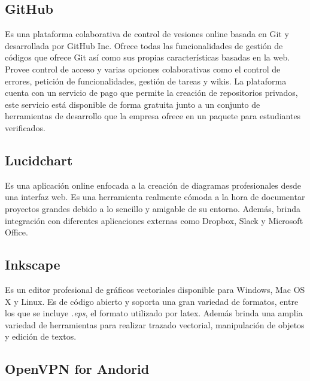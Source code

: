 \documentclass{article}
\begin{document}
    \subsection{GitHub}
        Es una plataforma colaborativa de control de vesiones online basada en Git y desarrollada por GitHub Inc. Ofrece todas las funcionalidades de gestión de códigos que ofrece Git así como sus propias características basadas en la web. Provee control de acceso y varias opciones colaborativas como el control de errores, petición de funcionalidades, gestión de tareas y wikis. La plataforma cuenta con un servicio de pago que permite la creación de repositorios privados, este servicio está disponible de forma gratuita junto a un conjunto de herramientas de desarrollo que la empresa ofrece en un paquete para estudiantes verificados.

    \subsection{Lucidchart}
        Es una aplicación online enfocada a la creación de diagramas profesionales desde una interfaz web. Es una herramienta realmente cómoda a la hora de documentar proyectos grandes debido a lo sencillo y amigable de su entorno. Además, brinda integración con diferentes aplicaciones externas como Dropbox, Slack y Microsoft Office. 

    \subsection{Inkscape}
        Es un editor profesional de gráficos vectoriales disponible para Windows, Mac OS X y Linux. Es de código abierto y soporta una gran variedad de formatos, entre los que se incluye \textit{.eps}, el formato utilizado por latex. Además brinda una amplia variedad de herramientas para realizar trazado vectorial, manipulación de objetos y edición de textos.

    \subsection{OpenVPN for Andorid}



\end{document}
